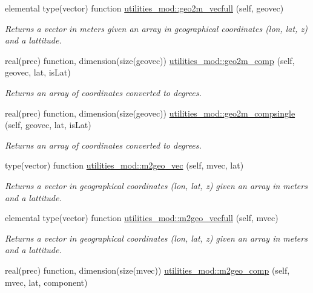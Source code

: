 \begin{DoxyCompactItemize}
elemental type(vector) function \mbox{\hyperlink{namespaceutilities__mod_ad0d629861220adba81d8622aa16f39ab}{utilities\+\_\+mod\+::geo2m\+\_\+vecfull}} (self, geovec)
\begin{DoxyCompactList}\small\item\em Returns a vector in meters given an array in geographical coordinates (lon, lat, z) and a lattitude. \end{DoxyCompactList}\item 
real(prec) function, dimension(size(geovec)) \mbox{\hyperlink{namespaceutilities__mod_a063ca10c2c57dc186ad0db0337fef4f9}{utilities\+\_\+mod\+::geo2m\+\_\+comp}} (self, geovec, lat, is\+Lat)
\begin{DoxyCompactList}\small\item\em Returns an array of coordinates converted to degrees. \end{DoxyCompactList}\item 
real(prec) function, dimension(size(geovec)) \mbox{\hyperlink{namespaceutilities__mod_a58dd5ed30b8ee9b9e1b43af96c119d28}{utilities\+\_\+mod\+::geo2m\+\_\+compsingle}} (self, geovec, lat, is\+Lat)
\begin{DoxyCompactList}\small\item\em Returns an array of coordinates converted to degrees. \end{DoxyCompactList}\item 
type(vector) function \mbox{\hyperlink{namespaceutilities__mod_a70b21b18c8633b7fd4c3057530d3f16f}{utilities\+\_\+mod\+::m2geo\+\_\+vec}} (self, mvec, lat)
\begin{DoxyCompactList}\small\item\em Returns a vector in geographical coordinates (lon, lat, z) given an array in meters and a lattitude. \end{DoxyCompactList}\item 
elemental type(vector) function \mbox{\hyperlink{namespaceutilities__mod_a0b374564c3672b029cc10d238bf77d4b}{utilities\+\_\+mod\+::m2geo\+\_\+vecfull}} (self, mvec)
\begin{DoxyCompactList}\small\item\em Returns a vector in geographical coordinates (lon, lat, z) given an array in meters and a lattitude. \end{DoxyCompactList}\item 
real(prec) function, dimension(size(mvec)) \mbox{\hyperlink{namespaceutilities__mod_ae6b8a45b229e3f1f8c2b12dd74e7a2dd}{utilities\+\_\+mod\+::m2geo\+\_\+comp}} (self, mvec, lat, component)

\end{DoxyCompactItemize}
